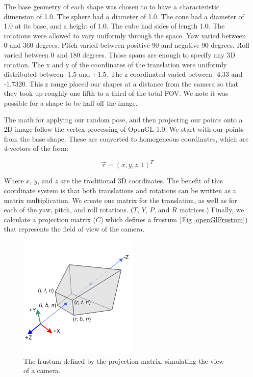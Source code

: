 \documentclass[journal]{IEEEtran}
\begin{document}
The base geometry of each shape was chosen to to have a characteristic dimension of 1.0. The sphere had a diameter of 1.0. The cone had a diameter of 1.0 at its base, and a height of 1.0. The cube had sides of length 1.0. The rotations were allowed to vary uniformly through the space. Yaw varied between 0 and 360 degrees. Pitch varied between positive 90 and negative 90 degrees. Roll varied between 0 and 180 degrees. Those spans are enough to specify any 3D rotation. The x and y of the coordinates of the translation were uniformly distributed between -1.5 and +1.5. The z coordinated varied between -4.33 and -1.7320. This z range placed our shapes at a distance from the camera so that they took up roughly one fifth to a third of the total FOV. We note it was possible for a shape to be half off the image.

The math for applying our random pose, and then projecting our points onto a 2D image follow the vertex processing of OpenGL 1.0. We start with our points from the base shape. These are converted to homogeneous coordinates, which are 4-vectors of the form:

\begin{equation}
\vec r = (x, y, z, 1)^T
\end{equation}

\noindent Where $x$, $y$, and $z$ are the traditional 3D coordinates.
The benefit of this coordinate system is that both translations and rotations can be written as a matrix multiplication. We create one matrix for the translation, as well as for each of the yaw, pitch, and roll rotations. ($T$, $Y$, $P$, and $R$ matrices.) Finally, we calculate a projection matrix ($C$) which defines a frustum (Fig \ref{openGlFrustum}) that represents the field of view of the camera.

\begin{figure}
	\hspace{-10 ex}

	\centering
	\includegraphics[width=.8\linewidth]{gl_projectionmatrix01}

	\caption{The frustum defined by the projection matrix, simulating the view of a camera. \cite{opengl_image}}
	\label{openglFrustum}
\end{figure}
\end{document}
